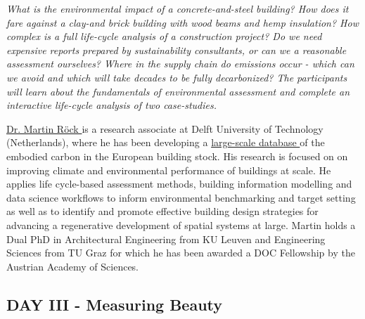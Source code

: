 \documentclass{article}
\begin{document}
\textit{What is the environmental impact of a concrete-and-steel building? How does it fare against a clay-and brick building with wood beams and hemp insulation? How complex is a full life-cycle analysis of a construction project? Do we need expensive reports prepared by sustainability consultants, or can we a reasonable assessment ourselves? Where in the supply chain do emissions occur - which can we avoid and which will take decades to be fully decarbonized? The participants will learn about the fundamentals of environmental assessment and complete an interactive life-cycle analysis of two case-studies.}

\href{https://www.linkedin.com/in/martinroeck/}{Dr. Martin Röck \ExternalLink} is a research associate at Delft University of Technology (Netherlands), where he has been developing a \href{https://github.com/mroeck/Embodied-Carbon-of-European-Buildings-Database}{large-scale database \ExternalLink}of the embodied carbon in the European building stock. His research is focused on  on improving climate and environmental performance of buildings at scale. He applies life cycle-based assessment methods, building information modelling and data science workflows to inform environmental benchmarking and target setting as well as to identify and promote effective building design strategies for advancing a regenerative development of spatial systems at large. Martin holds a Dual PhD in Architectural Engineering from KU Leuven and Engineering Sciences from TU Graz for which he has been awarded a DOC Fellowship by the Austrian Academy of Sciences.

\clearpage
\subsection{DAY III - Measuring Beauty}
\label{subsec:day_3}
\end{document}

